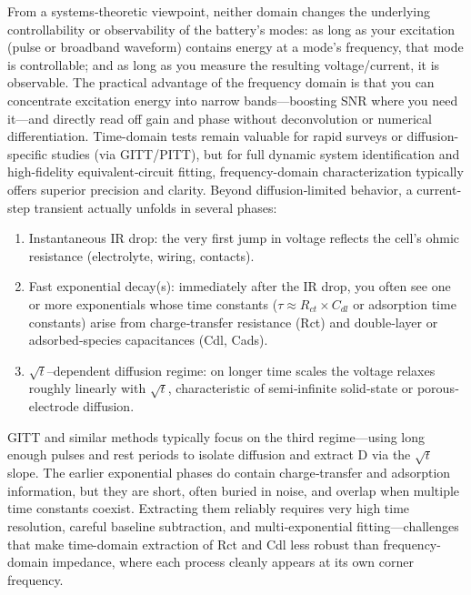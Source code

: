 From a systems‐theoretic viewpoint, neither domain changes the underlying controllability or observability of the battery’s modes: as long as your excitation (pulse or broadband waveform) contains energy at a mode’s frequency, that mode is controllable; and as long as you measure the resulting voltage/current, it is observable. The practical advantage of the frequency domain is that you can concentrate excitation energy into narrow bands—boosting SNR where you need it—and directly read off gain and phase without deconvolution or numerical differentiation. Time-domain tests remain valuable for rapid surveys or diffusion-specific studies (via GITT/PITT), but for full dynamic system identification and high-fidelity equivalent‐circuit fitting, frequency-domain characterization typically offers superior precision and clarity.
Beyond diffusion‐limited behavior, a current‐step transient actually unfolds in several phases:
\begin{enumerate}
    \item Instantaneous IR drop: the very first jump in voltage reflects the cell’s ohmic resistance (electrolyte, wiring, contacts).\\
\item Fast exponential decay(s): immediately after the IR drop, you often see one or more exponentials whose time constants ($\tau \approx R_{ct} \times C_{dl} $ or adsorption time constants) arise from charge‐transfer resistance (Rct) and double‐layer or adsorbed‐species capacitances (Cdl, Cads).\\
\item $\sqrt{t}$–dependent diffusion regime: on longer time scales the voltage relaxes roughly linearly with $\sqrt{t}$, characteristic of semi‐infinite solid‐state or porous‐electrode diffusion.
\end{enumerate}
GITT and similar methods typically focus on the third regime—using long enough pulses and rest periods to isolate diffusion and extract D via the $\sqrt{t}$ slope. The earlier exponential phases do contain charge‐transfer and adsorption information, but they are short, often buried in noise, and overlap when multiple time constants coexist. Extracting them reliably requires very high time resolution, careful baseline subtraction, and multi‐exponential fitting—challenges that make time-domain extraction of Rct and Cdl less robust than frequency-domain impedance, where each process cleanly appears at its own corner frequency.

